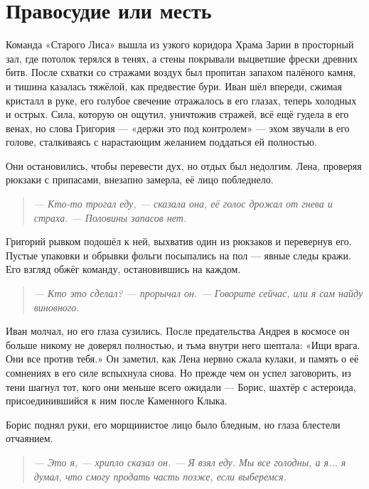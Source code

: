 \documentclass[12pt,a4paper]{book}
\newenvironment{dialogue}{\begin{quote}\itshape}{\end{quote}} %
\begin{document}
\chapter{Правосудие или месть}

Команда «Старого Лиса» вышла из узкого коридора Храма Зарии в просторный зал, где потолок терялся в тенях, а стены покрывали выцветшие фрески древних битв. После схватки со стражами воздух был пропитан запахом палёного камня, и тишина казалась тяжёлой, как предвестие бури. Иван шёл впереди, сжимая кристалл в руке, его голубое свечение отражалось в его глазах, теперь холодных и острых. Сила, которую он ощутил, уничтожив стражей, всё ещё гудела в его венах, но слова Григория --- «держи это под контролем» --- эхом звучали в его голове, сталкиваясь с нарастающим желанием поддаться ей полностью.

Они остановились, чтобы перевести дух, но отдых был недолгим. Лена, проверяя рюкзаки с припасами, внезапно замерла, её лицо побледнело.

\begin{dialogue}
--- Кто-то трогал еду, --- сказала она, её голос дрожал от гнева и страха. --- Половины запасов нет.
\end{dialogue}

Григорий рывком подошёл к ней, выхватив один из рюкзаков и перевернув его. Пустые упаковки и обрывки фольги посыпались на пол --- явные следы кражи. Его взгляд обжёг команду, остановившись на каждом.

\begin{dialogue}
--- Кто это сделал? --- прорычал он. --- Говорите сейчас, или я сам найду виновного.
\end{dialogue}

Иван молчал, но его глаза сузились. После предательства Андрея в космосе он больше никому не доверял полностью, и тьма внутри него шептала: «Ищи врага. Они все против тебя.» Он заметил, как Лена нервно сжала кулаки, и память о её сомнениях в его силе вспыхнула снова. Но прежде чем он успел заговорить, из тени шагнул тот, кого они меньше всего ожидали --- Борис, шахтёр с астероида, присоединившийся к ним после Каменного Клыка.

Борис поднял руки, его морщинистое лицо было бледным, но глаза блестели отчаянием.

\begin{dialogue}
--- Это я, --- хрипло сказал он. --- Я взял еду. Мы все голодны, а я... я думал, что смогу продать часть позже, если выберемся.
\end{dialogue}
\end{document}
